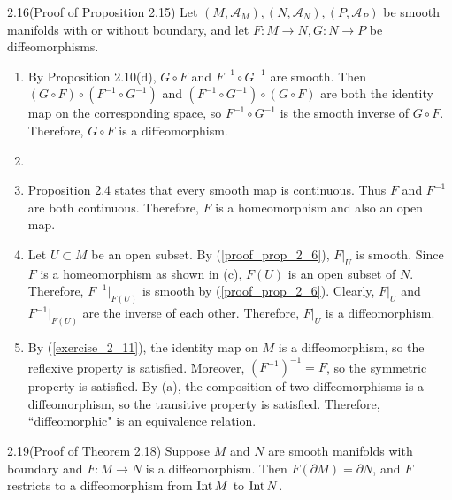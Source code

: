 \begin{customexer}{2.16(Proof of Proposition 2.15)}
  Let $(M, \mathcal{A}_M), (N, \mathcal{A}_N), (P, \mathcal{A}_P)$ be smooth manifolds with or without boundary, and let $F: M \rightarrow N, G: N \rightarrow P$ be diffeomorphisms.
  \begin{enumerate}[label=(\alph*)]
    \item 
      By Proposition 2.10(d), $G \circ F$ and $F^{-1} \circ G^{-1}$ are smooth.
      Then $(G \circ F) \circ (F^{-1} \circ G^{-1})$ and $(F^{-1} \circ G^{-1}) \circ (G \circ F)$ are both the identity map on the corresponding space, so $F^{-1} \circ G^{-1}$ is the smooth inverse of $G \circ F$.
      Therefore, $G \circ F$ is a diffeomorphism.
    \item
    \item
      Proposition 2.4 states that every smooth map is continuous.
      Thus $F$ and $F^{-1}$ are both continuous.
      Therefore, $F$ is a homeomorphism and also an open map.
    \item
      Let $U \subset M$ be an open subset.
      By (\ref{proof_prop_2_6}), $F\vert_U$ is smooth.
      Since $F$ is a homeomorphism as shown in (c), $F(U)$ is an open subset of $N$.
      Therefore, $F^{-1}\vert_{F(U)}$ is smooth by (\ref{proof_prop_2_6}).
      Clearly, $F\vert_U$ and $F^{-1}\vert_{F(U)}$ are the inverse of each other.
      Therefore, $F\vert_U$ is a diffeomorphism.
    \item
      By (\ref{exercise_2_11}), the identity map on $M$ is a diffeomorphism, so the reflexive property is satisfied.
      Moreover, $(F^{-1})^{-1} = F$, so the symmetric property is satisfied.
      By (a), the composition of two diffeomorphisms is a diffeomorphism, so the transitive property is satisfied.
      Therefore, ``diffeomorphic" is an equivalence relation.
  \end{enumerate}
\end{customexer}

\begin{customexer}{2.19(Proof of Theorem 2.18)}
  Suppose $M$ and $N$ are smooth manifolds with boundary and $F: M \rightarrow N$ is a diffeomorphism.
  Then $F(\partial M) = \partial N$, and $F$ restricts to a diffeomorphism from $\operatorname{Int} M$ to $\operatorname{Int} N$.
\end{customexer}

